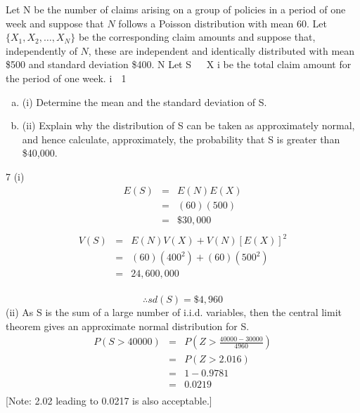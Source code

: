 \documentclass[a4paper,12pt]{article}
\begin{document}
Let N be the number of claims arising on a group of policies in a period of one week and suppose that $N$ follows a Poisson distribution with mean 60.
Let $\{X_1 , X_2 ,  \ldots , X_N \}$ be the corresponding claim amounts and suppose that, independently of $N$, these are independent and identically distributed with mean \$500
and standard deviation \$400.
N
Let S   X i be the total claim amount for the period of one week.
i  1
\begin{enumerate}[(a)]
\item (i) Determine the mean and the standard deviation of S.
\item (ii) Explain why the distribution of S can be taken as approximately normal, and hence calculate, approximately, the probability that S is greater than \$40,000.
\end{enumerate}

7
(i)
\begin{eqnarray*}E ( S ) &=& E ( N ) E ( X ) \\
&=& (60)(500) \\
&=& \$30, 000 \\
\end{eqnarray*}
\begin{eqnarray*}
V ( S ) &=& E ( N ) V ( X ) + V ( N )[ E ( X )]^2\\
&=& (60)(400^2 ) + (60)(500^2 ) \\
&=& 24, 600, 000  \\
\end{eqnarray*}

\[∴ sd ( S ) = \$4,960\]
(ii)
As S is the sum of a large number of i.i.d. variables, then the central limit theorem gives an approximate normal distribution for S.
\begin{eqnarray*}
P ( S > 40000) &=& P \left( Z > \frac{40000 − 30000}{4960} \right)\\
&=& P ( Z > 2.016)\\
&=& 1 − 0.9781 \\
&=& 0.0219\\
\end{eqnarray*}
[Note: 2.02 leading to 0.0217 is also acceptable.]
\end{document}
